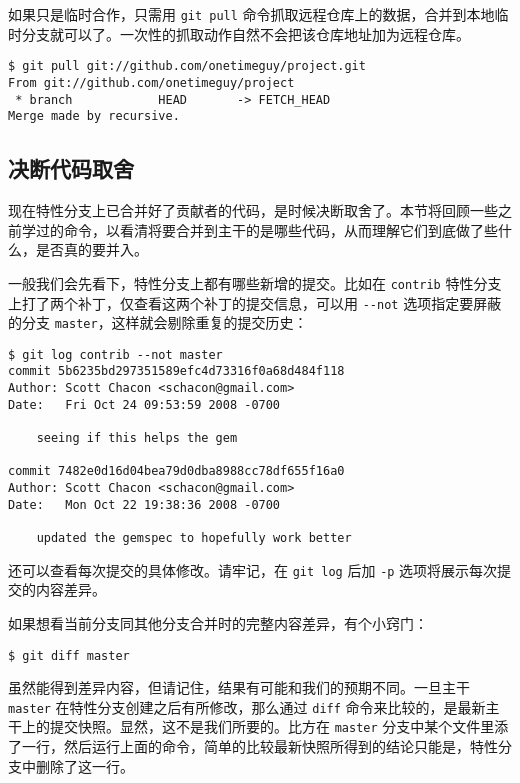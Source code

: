 \documentclass[a4paper]{book}
\begin{document}
如果只是临时合作，只需用 \texttt{git pull} 命令抓取远程仓库上的数据，合并到本地临时分支就可以了。一次性的抓取动作自然不会把该仓库地址加为远程仓库。

\begin{shaded}\begin{verbatim}
$ git pull git://github.com/onetimeguy/project.git
From git://github.com/onetimeguy/project
 * branch            HEAD       -> FETCH_HEAD
Merge made by recursive.
\end{verbatim}\end{shaded}

\subsection{决断代码取舍}

现在特性分支上已合并好了贡献者的代码，是时候决断取舍了。本节将回顾一些之前学过的命令，以看清将要合并到主干的是哪些代码，从而理解它们到底做了些什么，是否真的要并入。

一般我们会先看下，特性分支上都有哪些新增的提交。比如在 \texttt{contrib} 特性分支上打了两个补丁，仅查看这两个补丁的提交信息，可以用 \texttt{-{}-not} 选项指定要屏蔽的分支 \texttt{master}，这样就会剔除重复的提交历史：

\begin{shaded}\begin{verbatim}
$ git log contrib --not master
commit 5b6235bd297351589efc4d73316f0a68d484f118
Author: Scott Chacon <schacon@gmail.com>
Date:   Fri Oct 24 09:53:59 2008 -0700

    seeing if this helps the gem

commit 7482e0d16d04bea79d0dba8988cc78df655f16a0
Author: Scott Chacon <schacon@gmail.com>
Date:   Mon Oct 22 19:38:36 2008 -0700

    updated the gemspec to hopefully work better
\end{verbatim}\end{shaded}

还可以查看每次提交的具体修改。请牢记，在 \texttt{git log} 后加 \texttt{-p} 选项将展示每次提交的内容差异。

如果想看当前分支同其他分支合并时的完整内容差异，有个小窍门：

\begin{shaded}\begin{verbatim}
$ git diff master
\end{verbatim}\end{shaded}

虽然能得到差异内容，但请记住，结果有可能和我们的预期不同。一旦主干 \texttt{master} 在特性分支创建之后有所修改，那么通过 \texttt{diff} 命令来比较的，是最新主干上的提交快照。显然，这不是我们所要的。比方在 \texttt{master} 分支中某个文件里添了一行，然后运行上面的命令，简单的比较最新快照所得到的结论只能是，特性分支中删除了这一行。
\end{document}
